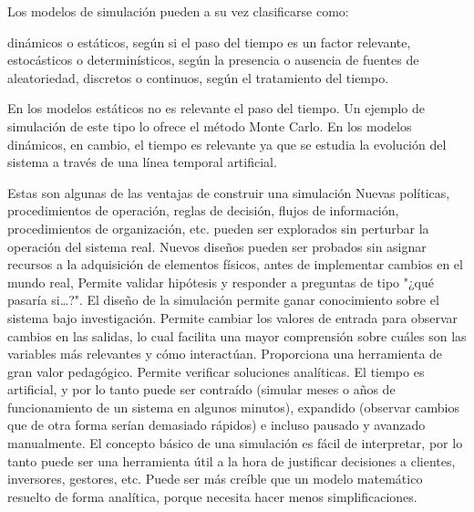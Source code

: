 \documentclass[]{article}
\begin{document}

Los modelos de simulación pueden a su vez clasificarse como:


dinámicos o estáticos, según si el paso del tiempo es un factor relevante,
estocásticos o determinísticos, según la presencia o ausencia de fuentes de aleatoriedad,
discretos o continuos, según el tratamiento del tiempo.

En los modelos estáticos no es relevante el paso del tiempo. Un ejemplo de
simulación de este tipo lo ofrece el método Monte Carlo. En los modelos
dinámicos, en cambio, el tiempo es relevante ya que se estudia la evolución del
sistema a través de una línea temporal artificial.


Estas son algunas de las ventajas de construir una simulación Nuevas políticas,
procedimientos de operación, reglas de decisión, flujos de información,
procedimientos de organización, etc. pueden ser explorados sin perturbar la
operación del sistema real.  Nuevos diseños pueden ser probados sin asignar
recursos a la adquisición de elementos físicos, antes de implementar cambios en
el mundo real, Permite validar hipótesis y responder a preguntas de tipo "¿qué
pasaría si…?".  El diseño de la simulación permite ganar conocimiento sobre el
sistema bajo investigación.  Permite cambiar los valores de entrada para
observar cambios en las salidas, lo cual facilita una mayor comprensión sobre
cuáles son las variables más relevantes y cómo interactúan.  Proporciona una
herramienta de gran valor pedagógico.  Permite verificar soluciones analíticas.
El tiempo es artificial, y por lo tanto puede ser contraído (simular meses o
años de funcionamiento de un sistema en algunos minutos), expandido (observar
cambios que de otra forma serían demasiado rápidos) e incluso pausado y
avanzado manualmente.  El concepto básico de una simulación es fácil de
interpretar, por lo tanto puede ser una herramienta útil a la hora de
justificar decisiones a clientes, inversores, gestores, etc.  Puede ser más
creíble que un modelo matemático resuelto de forma analítica, porque necesita
hacer menos simplificaciones.
\end{document}
